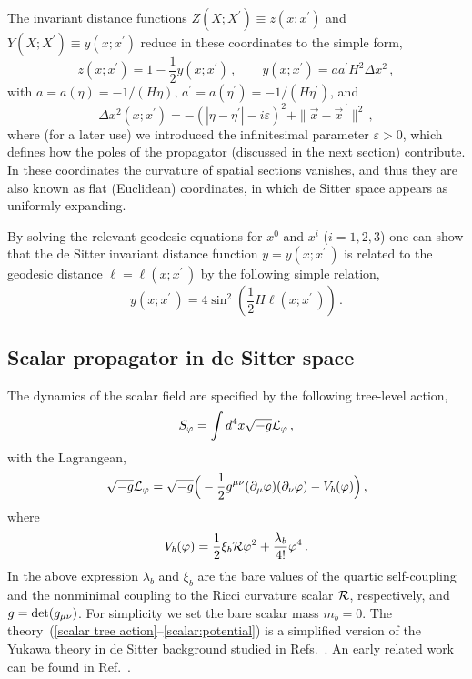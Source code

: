 The invariant distance functions $Z(X;X^\prime) \equiv
z(x;x^\prime)$ and $Y(X;X^\prime) \equiv y(x;x^\prime)$ reduce in
these coordinates to the simple form,
\begin{equation}
 z(x;x^\prime) = 1 - \frac 12 y(x;x^\prime)
\,,\qquad
 y(x;x^\prime) = aa^\prime H^2 \Delta x^2\,,
\label{invariant distance:2}
\end{equation}
with $a = a(\eta) = -1/(H\eta)$,
$a^\prime = a(\eta^\prime) = -1/(H\eta^\prime)$, and
\begin{equation}
\Delta x^2(x;x^\prime) = -(|\eta-\eta^\prime|-i\varepsilon)^2
                + \|\vec x-\vec x^{\,\prime}\|^2
\,,
\label{Delta x}
\end{equation}
where (for a later use)  we introduced the infinitesimal parameter
$\varepsilon>0$, which defines how the poles of the propagator
(discussed in the next section) contribute.
In these coordinates the curvature of spatial sections vanishes,
and thus they are also known as flat (Euclidean) coordinates, in which
de Sitter space appears as uniformly expanding.

 By solving the relevant geodesic equations for $x^0$ and $x^i$ ($i=1,2,3$)
one can show that the de Sitter invariant distance function
$y=y(x;x^\prime\,)$ is related to
the geodesic distance $\ell=\ell(x;x^\prime\,)$ by the following simple
relation,
\begin{equation}
 y(x;x^\prime\,) = 4 \sin^2\left(\frac12 H\ell(x;x^\prime\,)\right)
\,.
\label{geodesic distance}
\end{equation}

\subsection{Scalar propagator in de Sitter space}
\label{Scalar propagator in de Sitter space}

The dynamics of the scalar field are specified by the following
tree-level action,
\begin{eqnarray}
 S_\varphi = \int d^4 x \sqrt{-g} {\cal L}_\varphi
\,,
\label{scalar tree action}
\end{eqnarray}
with the Lagrangean,
\begin{eqnarray}
\sqrt{-g} {\cal L}_\varphi =
 \sqrt{-g}
   \Big(
   - \frac12 g^{\mu\nu}(\partial_\mu\varphi)(\partial_\nu\varphi)
   - V_b(\varphi)
 \Big)
\,,
\label{scalar lagrangean}
\end{eqnarray}
where
\begin{equation}
 V_b(\varphi) = \frac12 \xi_b {\cal
 R}\varphi^2 + \frac{\lambda_b}{4!} \varphi^4 \,.
\label{scalar:potential}
\end{equation}
In the above expression $\lambda_b$ and $\xi_b$ are the bare values of
the quartic self-coupling and the nonminimal coupling
to the Ricci curvature scalar ${\cal R}$, respectively, and
$g={\rm det}(g_{\mu\nu})$. For simplicity we set the bare scalar mass
$m_b=0$. The theory~(\ref{scalar tree action}--\ref{scalar:potential})
is a simplified version of the Yukawa theory in de Sitter background
studied in Refs.~\cite{Prokopec:2006,MiaoWoodard:2006}.
An early related work can be found in Ref.~\cite{CandelasRaine:1975}.

